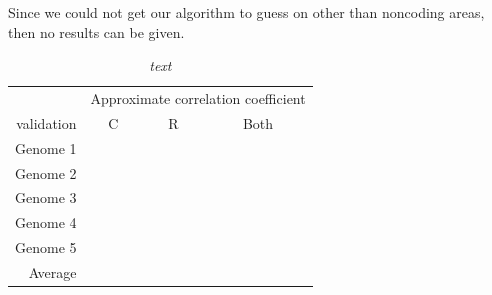 \documentclass[a4paper,10pt,article,oneside,english]{memoir}
\let\oldcaption\caption
\renewcommand{\caption}[1]{\oldcaption{\emph{#1}}}
\begin{document}
Since we could not get our algorithm to guess on other than noncoding areas, then no results can be given.
\begin{table}
	\centering
	\caption{text}
	\label{tab:ac}
	\begin{tabular}{rccc}
		& \multicolumn{3}{c}{Approximate correlation coefficient} \\ 
		validation & C & R & Both \\ 
		\midrule
		Genome 1 &  &  &  \\ 
		Genome 2 &  &  &  \\ 
		Genome 3 &  &  &  \\ 
		Genome 4 &  &  &  \\ 
		Genome 5 &  &  &  \\ 
		Average & & & \\
	\end{tabular} 
\end{table}
	
\end{document}
